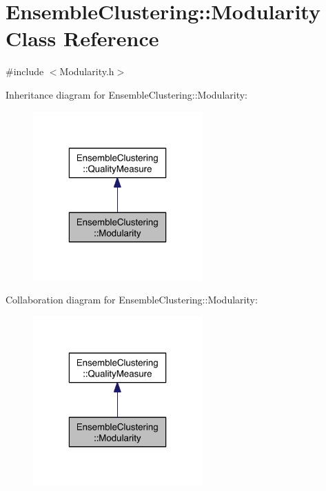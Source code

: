 \hypertarget{class_ensemble_clustering_1_1_modularity}{\section{Ensemble\-Clustering\-:\-:Modularity Class Reference}
\label{class_ensemble_clustering_1_1_modularity}
}


{\ttfamily \#include $<$Modularity.\-h$>$}



Inheritance diagram for Ensemble\-Clustering\-:\-:Modularity\-:\nopagebreak
\begin{figure}[H]
\begin{center}
\leavevmode
\includegraphics[width=184pt]{class_ensemble_clustering_1_1_modularity__inherit__graph}
\end{center}
\end{figure}


Collaboration diagram for Ensemble\-Clustering\-:\-:Modularity\-:
\nopagebreak
\begin{figure}[H]
\begin{center}
\leavevmode
\includegraphics[width=184pt]{class_ensemble_clustering_1_1_modularity__coll__graph}
\end{center}
\end{figure}
